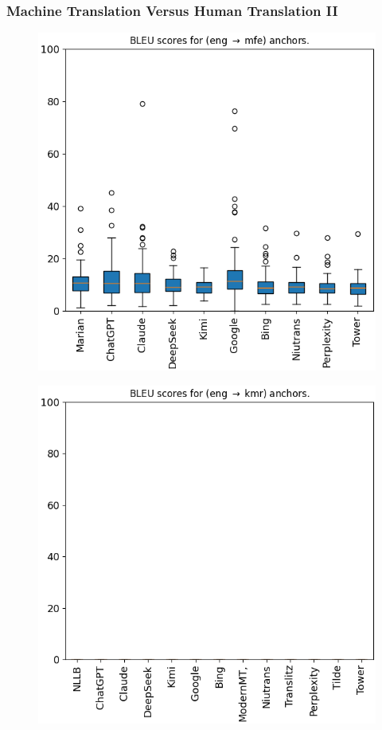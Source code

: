 \documentclass[aspectratio=169]{beamer}
\begin{document}
\begin{frame}[fragile]
	\frametitle{Machine Translation Versus Human Translation II}
    \begin{minipage}{.50\textwidth}
    \begin{figure}
        \centering
        \includegraphics[width=1.0\textwidth]{images/eval-01-Morisien-Anchors-bleu.png} 
    \end{figure}
    \end{minipage}%
    \begin{minipage}{.50\textwidth}
    \begin{figure}
        \centering
        \includegraphics[width=1.0\textwidth]{images/eval-01-Kurmanji-Anchors-bleu.png} 
    \end{figure}
    \end{minipage}
\end{frame}
\end{document}
